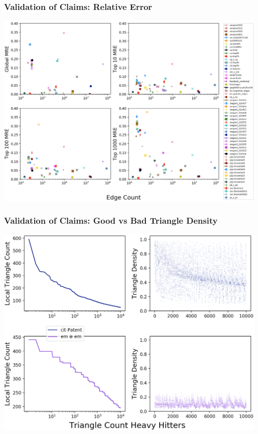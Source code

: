 \documentclass{beamer}
\begin{document}

\begin{frame}
\frametitle{Validation of Claims: Relative Error}

\centerline{\includegraphics[width=0.9\columnwidth]{errs_vs_E}}

\end{frame}


\begin{frame}
\frametitle{Validation of Claims: Good vs Bad Triangle Density}

\centerline{\includegraphics[width=0.8\columnwidth]{hh_comp}}

\end{frame}
\end{document}
